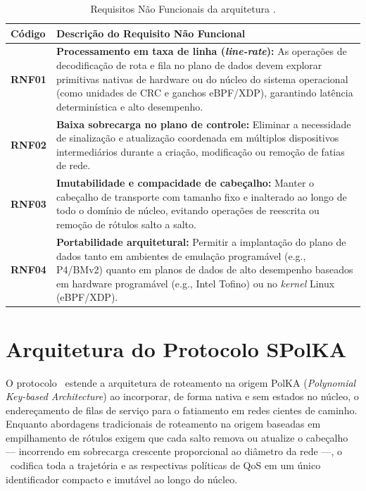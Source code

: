 \begin{table}[htb]
    \centering
    \caption{Requisitos Não Funcionais da arquitetura \nome.}
    \label{tab:req_nao_funcionais}
    \begin{tabular}{p{1.8cm} p{12.5cm}}
        \hline
        \textbf{Código} & \textbf{Descrição do Requisito Não Funcional} \\
        \hline
        \textbf{RNF01} & \textbf{Processamento em taxa de linha (\textit{line-rate}):} As operações de decodificação de rota e fila no plano de dados devem explorar primitivas nativas de hardware ou do núcleo do sistema operacional (como unidades de CRC e ganchos eBPF/XDP), garantindo latência determinística e alto desempenho. \\
        \textbf{RNF02} & \textbf{Baixa sobrecarga no plano de controle:} Eliminar a necessidade de sinalização e atualização coordenada em múltiplos dispositivos intermediários durante a criação, modificação ou remoção de fatias de rede. \\
        \textbf{RNF03} & \textbf{Imutabilidade e compacidade de cabeçalho:} Manter o cabeçalho de transporte com tamanho fixo e inalterado ao longo de todo o domínio de núcleo, evitando operações de reescrita ou remoção de rótulos salto a salto. \\
        \textbf{RNF04} & \textbf{Portabilidade arquitetural:} Permitir a implantação do plano de dados tanto em ambientes de emulação programável (e.g., P4/BMv2) quanto em planos de dados de alto desempenho baseados em hardware programável (e.g., Intel Tofino) ou no \textit{kernel} Linux (eBPF/XDP). \\
        \hline
    \end{tabular}
\end{table}

\section{Arquitetura do Protocolo SPolKA}
\label{sec:arquitetura_spolka}

O protocolo \nome\ estende a arquitetura de roteamento na origem PolKA (\textit{Polynomial Key-based Architecture}) \cite{dominicini2020} ao incorporar, de forma nativa e sem estados no núcleo, o endereçamento de filas de serviço para o fatiamento em redes cientes de caminho. Enquanto abordagens tradicionais de roteamento na origem baseadas em empilhamento de rótulos exigem que cada salto remova ou atualize o cabeçalho --- incorrendo em sobrecarga crescente proporcional ao diâmetro da rede ---, o \nome\ codifica toda a trajetória e as respectivas políticas de QoS em um único identificador compacto e imutável ao longo do núcleo.

